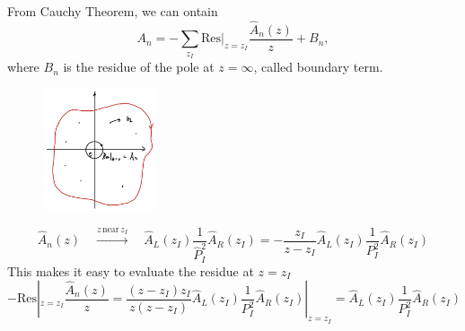 \documentclass{beamer}
\begin{document}
\begin{frame}
    From Cauchy Theorem, we can ontain
    \begin{equation*}
        A_n=-\sum_{z_I}\textrm{Res}|_{z=z_I}\frac{\hat{A}_n(z)}{z}+B_n,
    \end{equation*}
    where $B_n$ is the residue of the pole at $z=\infty$, called boundary term.
    \vspace{-1em}
    \begin{figure}[htbp]
        \centering
        \includegraphics[width=0.3\textwidth]{CT.png}
    \end{figure}
    \vspace{-1.5em}
    \begin{equation*}
        \hat{A}_n(z)\quad \xrightarrow{z\,\text{near}\,z_I} \quad \hat{A}_L(z_I)\frac{1}{\hat{P}_I^2}\hat{A}_R(z_I)= - \frac{z_I}{z-z_I}\hat{A}_L(z_I)\frac{1}{P_I^2}\hat{A}_R(z_I)
    \end{equation*}
    This makes it easy to evaluate the residue at $z=z_I$
    \begin{equation*}
        -\mathrm{Res}|_{z=z_I}\frac{\hat{A}_n(z)}{z}=\frac{(z-z_I)z_I}{z(z-z_I)}\hat{A}_L(z_I)\frac{1}{P_I^2}\hat{A}_R(z_I)|_{z=z_I}=\hat{A}_L(z_I)\frac{1}{P_I^2}\hat{A}_R(z_I)
    \end{equation*}
\end{frame}
\end{document}
